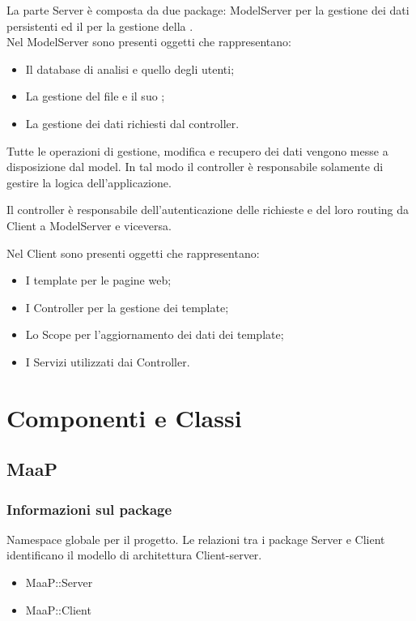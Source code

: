La parte Server è composta da due package: ModelServer per la gestione dei dati persistenti ed il  per la gestione della .\\
Nel ModelServer sono presenti oggetti che rappresentano:
\begin{itemize}
\item Il database di analisi e quello degli utenti;
\item La gestione del file  e il suo ;
\item La gestione dei dati richiesti dal controller.
\end{itemize}
Tutte le operazioni di gestione, modifica e recupero dei dati vengono messe a disposizione dal model. In tal modo il controller è responsabile solamente di gestire la logica dell'applicazione.

Il controller è responsabile dell'autenticazione delle richieste e del loro routing da Client a ModelServer e viceversa.

Nel Client sono presenti oggetti che rappresentano:
\begin{itemize}
\item I template per le pagine web;
\item I Controller per la gestione dei template;
\item Lo Scope per l'aggiornamento dei dati dei template;
\item I Servizi utilizzati dai Controller.
\end{itemize}

\newpage
\section{Componenti e Classi}

\subsection{MaaP}
\subsubsection{Informazioni sul package}
Namespace globale per il progetto. Le relazioni tra i package Server e Client identificano il modello di architettura Client-server.
\begin{itemize}
\item MaaP::Server
\item MaaP::Client
\end{itemize}

